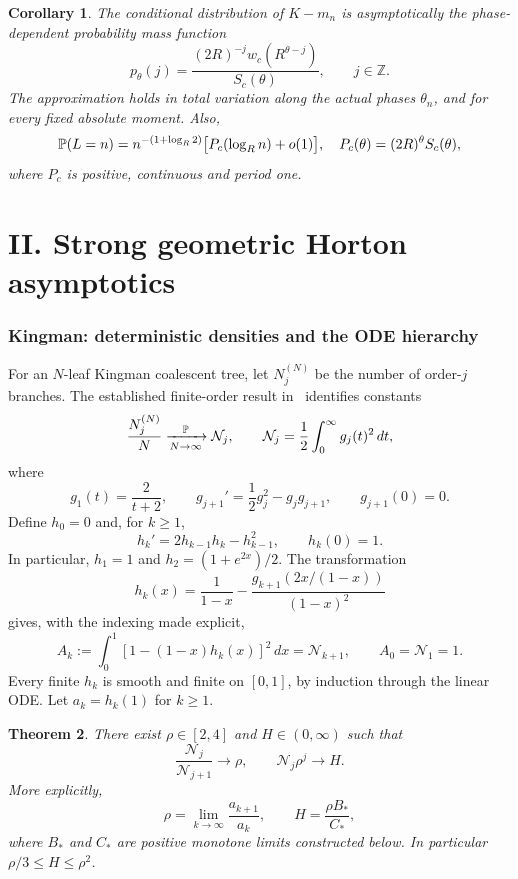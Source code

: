 \documentclass[11pt,a4paper]{article}
\newtheorem{theorem}{Theorem}[section]
\newtheorem{corollary}[theorem]{Corollary}
\theoremstyle{remark}\newtheorem{remark}[theorem]{Remark}
\newcommand{\NN}{\mathcal N}
\begin{document}
\begin{corollary}
The conditional distribution of $K-m_n$ is asymptotically the phase-dependent probability mass function
\[
p_\theta(j)=\frac{(2R)^{-j}w_c(R^{\theta-j})}{S_c(\theta)},\qquad j\in\mathbb Z.
\]
The approximation holds in total variation along the actual phases $\theta_n$, and for every fixed absolute moment. Also,
\[
\mathbb P(L=n)=n^{-(1+\log_R2)}\bigl[P_c(\log_Rn)+o(1)\bigr],
\quad P_c(\theta)=(2R)^\theta S_c(\theta),
\]
where $P_c$ is positive, continuous and period one.
\end{corollary}

\part*{II. Strong geometric Horton asymptotics}
\section{Kingman: deterministic densities and the ODE hierarchy}
For an $N$-leaf Kingman coalescent tree, let $N_j^{(N)}$ be the number of order-$j$ branches. The established finite-order result in~\cite{KZ2017} identifies constants
\[
\frac{N_j^{(N)}}{N}\xrightarrow[N\to\infty]{\Pp}\NN_j,
\qquad \NN_j=\frac12\int_0^\infty g_j(t)^2\,dt,
\]
where
\[
g_1(t)=\frac2{t+2},\qquad
g_{j+1}'=\frac12g_j^2-g_jg_{j+1},\qquad g_{j+1}(0)=0.
\]
Define $h_0=0$ and, for $k\ge1$,
\begin{equation}\label{eq:hode}
h_k'=2h_{k-1}h_k-h_{k-1}^2,\qquad h_k(0)=1.
\end{equation}
In particular, $h_1=1$ and $h_2=(1+e^{2x})/2$. The transformation
\[
h_k(x)=\frac1{1-x}-\frac{g_{k+1}(2x/(1-x))}{(1-x)^2}
\]
gives, with the indexing made explicit,
\begin{equation}\label{eq:Ak}
A_k:=\int_0^1[1-(1-x)h_k(x)]^2\,dx=\NN_{k+1},\qquad A_0=\NN_1=1.
\end{equation}
Every finite $h_k$ is smooth and finite on $[0,1]$, by induction through the linear ODE. Let $a_k=h_k(1)$ for $k\ge1$.

\begin{theorem}\label{thm:kingman}
There exist $\rho\in[2,4]$ and $H\in(0,\infty)$ such that
\[
\boxed{\frac{\NN_j}{\NN_{j+1}}\longrightarrow\rho,
\qquad \NN_j\rho^j\longrightarrow H.}
\]
More explicitly,
\[
\rho=\lim_{k\to\infty}\frac{a_{k+1}}{a_k},\qquad
H=\frac{\rho B_*}{C_*},
\]
where $B_*$ and $C_*$ are positive monotone limits constructed below. In particular $\rho/3\le H\le\rho^2$.
\end{theorem}
\end{document}
